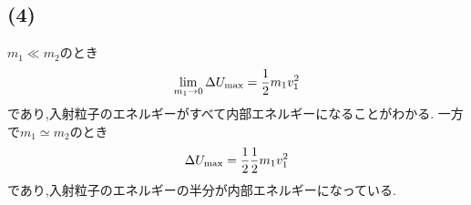 \documentclass[uplatex,a4j,11pt,dvipdfmx]{jsarticle}
\begin{document}
\subsection*{(4)}
$m_1\ll m_2$のとき
\begin{align}
  \lim_{m_1\rightarrow0} \Delta U_{\rm max}=\frac{1}{2}m_1v_1^2
\end{align}
であり,入射粒子のエネルギーがすべて内部エネルギーになることがわかる.
一方で$m_1\simeq m_2$のとき
\begin{align}
  \Delta U_{\rm max}=\frac{1}{2}\frac{1}{2}m_1v_1^2
\end{align}
であり,入射粒子のエネルギーの半分が内部エネルギーになっている.

\end{document}
